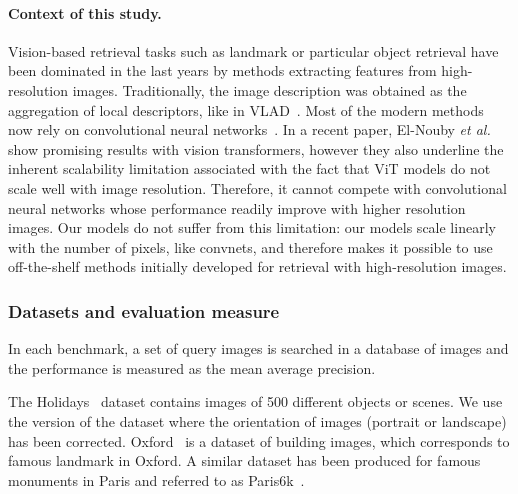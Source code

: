 \paragraph{Context of this study. } 
Vision-based retrieval tasks such as landmark or particular object retrieval have been dominated in the last years by  methods extracting features from high-resolution images. Traditionally, the image description was obtained as the aggregation of local descriptors, like in VLAD~\cite{jegou2012aggregating}. Most of the modern methods now rely on convolutional neural networks~\cite{berman2019multigrain,Gordo2017EndtoEndLO,tolias2016particular}. 
In a recent paper, El-Nouby \emph{et al.}~\cite{el2021training} show promising results with vision transformers, however they also underline the inherent scalability limitation associated with the fact that ViT models do not scale well with image resolution. Therefore, it  cannot compete with convolutional neural networks whose performance readily improve with higher resolution images. Our \OURS models do not suffer from this limitation: our models scale linearly with the number of pixels, like convnets, and therefore makes it possible to use off-the-shelf methods initially developed for retrieval with high-resolution images. 



\subsubsection{Datasets and evaluation measure} 
In each benchmark, a set of query images is searched in a database of images and the performance is measured as the mean average precision. 

The Holidays~\cite{Jegou2008HammingEA} dataset contains images of 500 different objects or scenes. 
We use the version of the dataset where the orientation of images (portrait or landscape) has been corrected.
Oxford~\cite{Philbin07} is a dataset of building images, which corresponds to famous landmark in Oxford. A similar dataset has been produced for famous monuments in Paris and referred to as Paris6k~\cite{chum2007total}. 

\begin{table}[h!]
\begin{center}
\caption{\textbf{The basic statistics on the image retrieval datasets.}}\vspace*{3pt}
\end{center}
\end{table}

